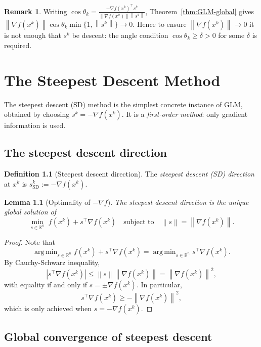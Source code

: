 \documentclass[11pt,a4paper]{report}
\theoremstyle{plain}
\newtheorem{lemma}[theorem]{Lemma}
\theoremstyle{definition}
\newtheorem{definition}[theorem]{Definition}
\newtheorem{remark}[theorem]{Remark}
\newcommand{\R}{\mathbb{R}}
\newcommand{\norm}[1]{\left\lVert#1\right\rVert}
\newcommand{\grad}{\nabla}
\DeclareMathOperator*{\argmin}{arg\,min}
\newcommand{\trans}{^{\top}}
\begin{document}
\begin{remark}\label{rem:angle}
Writing $\cos\theta_{k}=\frac{-\grad f(x^{k})\trans s^{k}}{\norm{\grad f(x^{k})}\norm{s^{k}}}$,
Theorem~\ref{thm:GLM-global} gives
$\norm{\grad f(x^{k})}\cos\theta_{k}\min\{1,\norm{s^{k}}\}\to 0$.
Hence to ensure $\norm{\grad f(x^{k})}\to 0$ it is not enough that $s^{k}$ be
descent: the angle condition $\cos\theta_{k}\ge\delta>0$ for some $\delta$ is
required.
\end{remark}


\chapter{The Steepest Descent Method}

The steepest descent (SD) method is the simplest concrete instance of GLM, obtained
by choosing $s^{k}=-\grad f(x^{k})$. It is a \emph{first-order method}: only
gradient information is used.

\section{The steepest descent direction}

\begin{definition}[Steepest descent direction]
The \emph{steepest descent (SD) direction} at $x^{k}$ is
$s^{k}_{\mathrm{SD}}:=-\grad f(x^{k})$.
\end{definition}

\begin{lemma}[Optimality of $-\grad f$]\label{lem:SD}
The steepest descent direction is the unique global solution of
\[
\min_{s\in\R^{n}}\; f(x^{k})+s\trans\grad f(x^{k})
\quad\text{subject to}\quad \norm{s}=\norm{\grad f(x^{k})}.
\]
\end{lemma}
\begin{proof}
  Note that
  \[
    \argmin_{s\in\R^{n}} f(x^{k}) + s\trans\grad f(x^{k}) = \argmin_{s\in\R^{n}} s\trans\grad f(x^{k}).
  \]
  By Cauchy-Schwarz inequality,
  \[
    |s\trans\grad f(x^{k})| \leq \norm{s}\norm{\grad f(x^{k})} = \norm{\grad f(x^{k})}^2,
  \]
  with equality if and only if $s = \pm\grad f(x^{k})$. In particular,
  \[
    s\trans\grad f(x^{k}) \geq -\norm{\grad f(x^{k})}^2,
  \]
  which is only achieved when $s = -\grad f(x^{k})$.
\end{proof}

\section{Global convergence of steepest descent}
\end{document}
